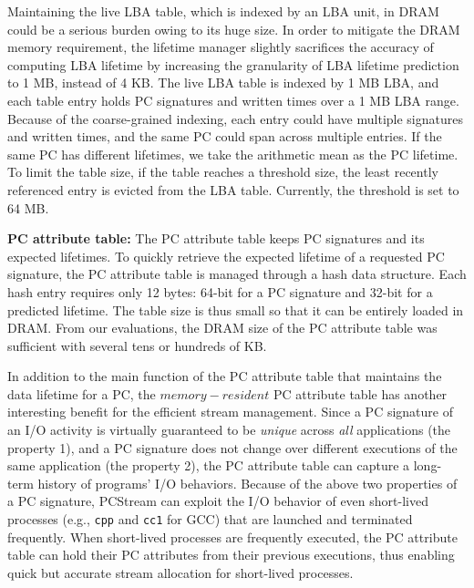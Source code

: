 Maintaining the live LBA table, which is indexed by an LBA unit, in DRAM could
be a serious burden owing to its huge size. In order to mitigate the DRAM
memory requirement, the lifetime manager slightly sacrifices the accuracy of
computing LBA lifetime by increasing the granularity of LBA lifetime prediction
to 1 MB, instead of 4 KB.  The live LBA table is indexed by 1 MB LBA, and each
table entry holds PC signatures and written times over a 1 MB LBA range.
Because of the coarse-grained indexing, each entry could have multiple
signatures and written times, and the same PC could span across multiple
entries.  If the same PC has different lifetimes, we take the arithmetic mean
as the PC lifetime.  To limit the table size, if the table reaches a threshold
size, the least recently referenced entry is evicted from the LBA table.
Currently, the threshold is set to 64 MB.

\textbf{PC attribute table:}
The PC attribute table keeps PC signatures and its expected lifetimes. To
quickly retrieve the expected lifetime of a requested PC signature, the PC
attribute table is managed through a hash data structure. Each hash entry
requires only 12 bytes: 64-bit for a PC signature and 32-bit for a predicted
lifetime.  The table size is thus small so that it can be entirely loaded
in DRAM.  From our evaluations, the DRAM size of the PC attribute table was
sufficient with several tens or hundreds of KB.

In addition to the main function of the PC attribute table that maintains the
data lifetime for a PC, the $memory-resident$ PC attribute table has another
interesting benefit for the efficient stream management.  Since a PC
signature of an I/O activity is virtually guaranteed to be {\it unique} across
{\it all} applications (the property 1),  and a PC signature does not change
over different executions of the same application (the property 2), the PC
attribute table can capture a long-term history of programs' I/O behaviors.
Because of the above two properties of a PC signature, \textsf{\small PCStream}
can exploit the I/O behavior of even short-lived processes (e.g., \texttt{cpp}
and \texttt{cc1} for GCC)  that are launched and terminated frequently.  When
short-lived processes are frequently executed, the PC attribute table can hold
their PC attributes from their previous executions, thus enabling quick but
accurate stream allocation for short-lived processes.

